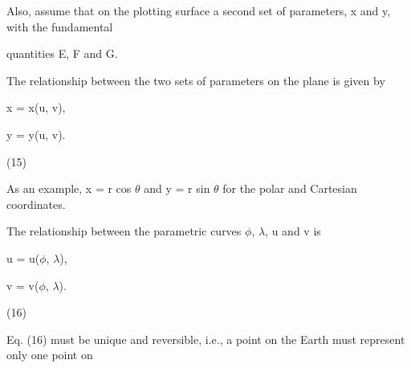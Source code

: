 \documentclass[a4paper,portrait,12pt]{article}
\begin{document}
\begin{flushleft}
Also, assume that on the plotting surface a second set of parameters, x and y, with the fundamental
\end{flushleft}


\begin{flushleft}
quantities E, F and G.
\end{flushleft}


\begin{flushleft}
The relationship between the two sets of parameters on the plane is given by
\end{flushleft}


\begin{flushleft}
x = x(u, v),
\end{flushleft}





\begin{flushleft}
y = y(u, v).
\end{flushleft}





(15)





\begin{flushleft}
As an example, x = r cos $\theta$ and y = r sin $\theta$ for the polar and Cartesian coordinates.
\end{flushleft}


\begin{flushleft}
The relationship between the parametric curves $\phi$, $\lambda$, u and v is
\end{flushleft}


\begin{flushleft}
u = u($\phi$, $\lambda$),
\end{flushleft}





\begin{flushleft}
v = v($\phi$, $\lambda$).
\end{flushleft}





(16)





\begin{flushleft}
Eq. (16) must be unique and reversible, i.e., a point on the Earth must represent only one point on
\end{flushleft}
\end{document}
